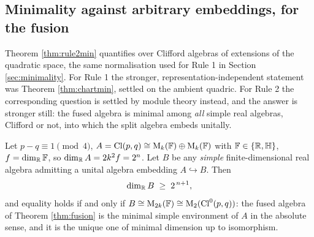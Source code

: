 \subsection{Minimality against arbitrary embeddings, for the fusion}\label{subsec:embmin}

Theorem \ref{thm:rule2min} quantifies over Clifford algebras of extensions of the quadratic space, the same normalisation used for Rule 1 in Section \ref{sec:minimality}. For Rule 1 the stronger, representation-independent statement was Theorem \ref{thm:chartmin}, settled on the ambient quadric. For Rule 2 the corresponding question is settled by module theory instead, and the answer is stronger still: the fused algebra is minimal among \emph{all} simple real algebras, Clifford or not, into which the split algebra embeds unitally.

\begin{theorem}\label{thm:embmin}
Let $p - q \equiv 1 \pmod 4$, $A = \mathrm{Cl}(p,q) \cong \mathrm{M}_k(\mathbb{F}) \oplus \mathrm{M}_k(\mathbb{F})$ with $\mathbb{F} \in \{\mathbb{R}, \mathbb{H}\}$, $f = \dim_{\mathbb{R}} \mathbb{F}$, so $\dim_{\mathbb{R}} A = 2k^2 f = 2^n$. Let $B$ be any \emph{simple} finite-dimensional real algebra admitting a unital algebra embedding $A \hookrightarrow B$. Then
\[
\dim_{\mathbb{R}} B \;\geq\; 2^{\,n+1},
\]
and equality holds if and only if $B \cong \mathrm{M}_{2k}(\mathbb{F}) \cong \mathrm{M}_2(\mathrm{Cl}^0(p,q))$: the fused algebra of Theorem \ref{thm:fusion} is the minimal simple environment of $A$ in the absolute sense, and it is the unique one of minimal dimension up to isomorphism.
\end{theorem}

